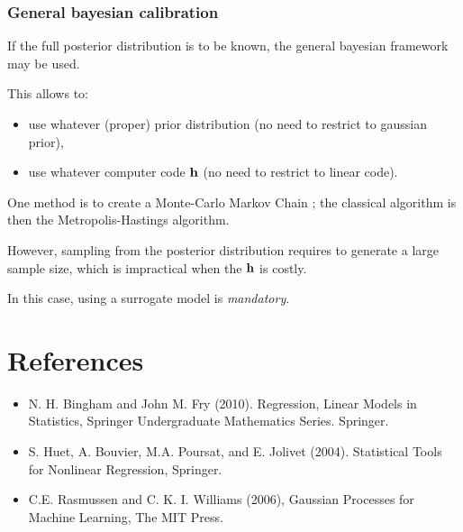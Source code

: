 \documentclass{beamer}
\begin{document}
\begin{frame}
\frametitle{General bayesian calibration}

If the full posterior distribution is to be known, the 
general bayesian framework may be used. 

This allows to:
\begin{itemize}
\item use whatever (proper) prior distribution (no need to restrict to gaussian 
prior),
\item use whatever computer code ${\bf h}$ (no need to restrict to linear 
code).
\end{itemize}

One method is to create a Monte-Carlo Markov Chain ; the classical algorithm is then the 
Metropolis-Hastings algorithm. 

However, sampling from the posterior distribution 
requires to generate a large sample size, which is impractical 
when the ${\bf h}$ is costly. 

In this case, using a surrogate model is \emph{mandatory}. 

\end{frame}

\section{References}

\begin{itemize}
\item  N. H. Bingham and John M. Fry (2010). Regression, Linear Models in Statistics, Springer Undergraduate Mathematics Series. Springer.
\item S. Huet, A. Bouvier, M.A. Poursat, and E. Jolivet (2004). Statistical Tools for Nonlinear Regression, Springer.
\item C.E. Rasmussen and C. K. I. Williams (2006), Gaussian Processes for Machine Learning, The MIT Press.
\end{itemize}
\end{document}
